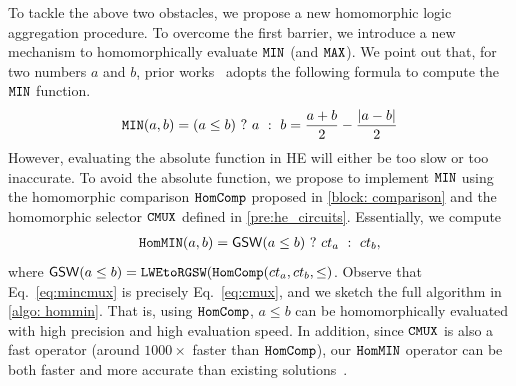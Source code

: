To tackle the above two obstacles, we propose a new homomorphic logic aggregation procedure.
To overcome the first barrier, we introduce a new mechanism
to homomorphically evaluate $\texttt{MIN}$ (and $\texttt{MAX}$). We point out
that, for two numbers $a$ and $b$, prior works~\cite{ckkscomparison, pegasus} adopts the following formula
to compute the $\texttt{MIN}$ function.
\begin{equation}
    \texttt{MIN}(a, b) = (a \leq b)\text{ } ? \text{ }a\text{ } :\text{ } b
    =
    \frac{a+b}{2} - \frac{\lvert {a-b} \rvert}{2} 
    \label{formula: sminmax}
\end{equation} 
However, evaluating the absolute function in HE will either be too slow
or too inaccurate. To avoid the absolute function, we propose to implement $\texttt{MIN}$ 
using the homomorphic comparison $\texttt{HomComp}$ proposed in \cref{block: comparison}
and the homomorphic selector $\texttt{CMUX}$  defined in \cref{pre:he_circuits}. Essentially,
we compute
\begin{align}\label{eq:mincmux}
{\texttt{HomMIN}}(a, b) = {\mathsf{GSW}}(a \leq b)\text{ }?\text{ }ct_a\text{ }:\text{ }ct_b,
\end{align}
where ${\mathsf{GSW}}(a\leq b)=\texttt{LWEtoRGSW}(\texttt{HomComp}(ct_a, ct_b, \leq)$. Observe that Eq.~\eqref{eq:mincmux} is precisely Eq.~\eqref{eq:cmux},
and we sketch the full algorithm in \cref{algo: hommin}. That is, using $\texttt{HomComp}$, 
$a\leq b$ can be homomorphically evaluated with high precision and high evaluation speed.
In addition, since $\texttt{CMUX}$ is also a fast operator (around $1000\times$ faster than
$\texttt{HomComp}$), our ${\texttt{HomMIN}}$ operator can be both faster and more accurate
than existing solutions~\cite{pegasus,ckkscomparison}.


